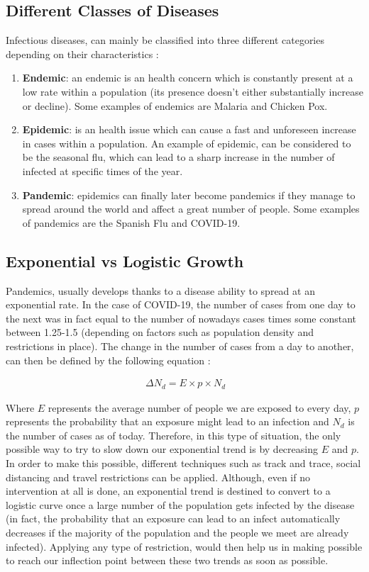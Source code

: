 \subsection{Different Classes of Diseases}
Infectious diseases, can mainly be classified into three different categories depending on their characteristics \cite{2minclass}:
\begin{enumerate}
    \item \textbf{Endemic}: an endemic is an health concern which is constantly present at a low rate within a population (its presence doesn't either substantially increase or decline). Some examples of endemics are Malaria and Chicken Pox.
    \item \textbf{Epidemic}: is an health issue which can cause a fast and unforeseen increase in cases within a population. An example of epidemic, can be considered to be the seasonal flu, which can lead to a sharp increase in the number of infected at specific times of the year.
    \item \textbf{Pandemic}: epidemics can finally later become pandemics if they manage to spread around the world and affect a great number of people. Some examples of pandemics are the Spanish Flu and COVID-19.
\end{enumerate}

\subsection{Exponential vs Logistic Growth}
\label{explog}
Pandemics, usually develops thanks to a disease ability to spread at an exponential rate. In the case of COVID-19, the number of cases from one day to the next was in fact equal to the number of nowadays cases times some constant between 1.25-1.5 (depending on factors such as population density and restrictions in place). The change in the number of cases from a day to another, can then be defined by the following equation \cite{exponentials}:

\useshortskip
\begin{align}
\ \Delta N_{d} = E \times p \times N_{d}
\label{n_new}
\end{align}
\useshortskip

Where $E$ represents the average number of people we are exposed to every day, $p$ represents the probability that an exposure might lead to an infection and $N_{d}$ is the number of cases as of today. Therefore, in this type of situation, the only possible way to try to slow down our exponential trend is by decreasing $E$ and $p$. In order to make this possible, different techniques such as track and trace, social distancing and travel restrictions can be applied. Although, even if no intervention at all is done, an exponential trend is destined to convert to a logistic curve once a large number of the population gets infected by the disease (in fact, the probability that an exposure can lead to an infect automatically decreases if the majority of the population and the people we meet are already infected). Applying any type of restriction, would then help us in making possible to reach our inflection point between these two trends as soon as possible.

